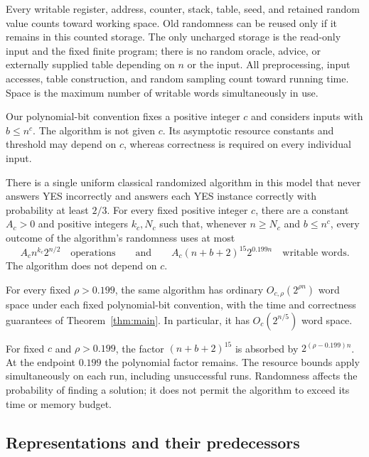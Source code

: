 Every writable register, address, counter, stack, table, seed, and
retained random value counts toward working space. Old randomness can
be reused only if it remains in this counted storage. The only
uncharged storage is the read-only input and the fixed finite program;
there is no random oracle, advice, or externally supplied table
depending on $n$ or the input. All preprocessing, input accesses,
table construction, and random sampling count toward running time.
Space is the maximum number of writable words simultaneously in use.

Our polynomial-bit convention fixes a positive integer $c$ and
considers inputs with $b\le n^c$. The algorithm is not given $c$.
Its asymptotic resource constants and threshold may depend on $c$,
whereas correctness is required on every individual input.

\begin{theorem}
\label{thm:main}
There is a single uniform classical randomized algorithm in this model that
never answers YES incorrectly and answers each YES instance correctly
with probability at least $2/3$. For every fixed positive integer $c$,
there are a constant $A_c>0$ and positive integers $k_c,N_c$ such that,
whenever $n\ge N_c$ and $b\le n^c$, every outcome of the algorithm's
randomness uses at most
\[
 A_c n^{k_c}2^{n/2}\quad\text{operations}
 \qquad\text{and}\qquad
 A_c(n+b+2)^{15}2^{0.199n}\quad\text{writable words}.
\]
The algorithm does not depend on $c$.
\end{theorem}

\begin{corollary}
\label{cor:target}
For every fixed $\rho>0.199$, the same algorithm has ordinary
$O_{c,\rho}(2^{\rho n})$ word space under each fixed polynomial-bit
convention, with the time and correctness guarantees of
Theorem~\ref{thm:main}. In particular, it has
$O_c(2^{n/5})$ word space.
\end{corollary}

For fixed $c$ and $\rho>0.199$, the factor $(n+b+2)^{15}$ is absorbed
by $2^{(\rho-0.199)n}$. At the endpoint $0.199$ the polynomial
factor remains. The resource bounds apply simultaneously on each run,
including unsuccessful runs. Randomness affects the probability of
finding a solution; it does not permit the algorithm to exceed its
time or memory budget.

\subsection{Representations and their predecessors}

